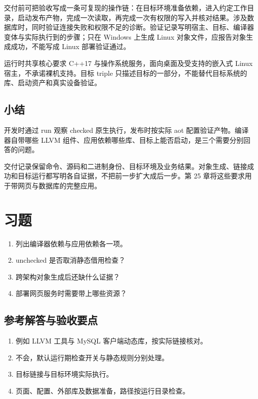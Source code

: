 交付前可把验收写成一条可复现的操作链：在目标环境准备依赖，进入约定工作目录，启动发布产物，完成一次读取，再完成一次有权限的写入并核对结果。涉及数据库时，同时验证连接失败和权限不足的诊断。验证记录写明宿主、目标、编译器变体与实际执行到的步骤；只在 Windows 上生成 Linux 对象文件，应报告对象生成成功，不能写成 Linux 部署验证通过。

运行时共享核心要求 C++17 与操作系统服务，面向桌面及受支持的嵌入式 Linux 宿主，不承诺裸机支持。目标 triple 只描述目标的一部分，不能替代目标系统的库、启动资产和真实设备验证。

\subsection*{小结}

开发时通过 run 观察 checked 原生执行，发布时按实际 aot 配置验证产物。编译器自带哪些 LLVM 组件、应用依赖哪些库、目标上能否启动，是三个需要分别回答的问题。

交付记录保留命令、源码和二进制身份、目标环境及业务结果。对象生成、链接成功和目标运行都写明各自证据，不把前一步扩大成后一步。第 25 章将这些要求用于带网页与数据库的完整应用。

\section{习题}

\begin{enumerate}

\item 列出编译器依赖与应用依赖各一项。

\item unchecked 是否取消静态借用检查？

\item 跨架构对象生成后还缺什么证据？

\item 部署网页服务时需要带上哪些资源？

\end{enumerate}

\subsection*{参考解答与验收要点}

\begin{enumerate}

\item 例如 LLVM 工具与 MySQL 客户端动态库，按实际链接核对。

\item 不会，默认运行期检查开关与静态规则分别处理。

\item 目标链接与目标环境实际执行。

\item 页面、配置、外部库及数据准备，路径按运行目录检查。

\end{enumerate}

